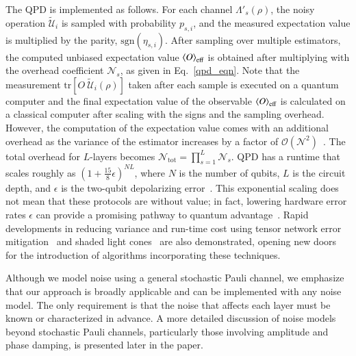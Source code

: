 \documentclass[10pt, superscriptaddress,aps,pra,twocolumn,showpacs,nofootinbib, longbibliography, notitlepage,floatfix]{revtex4-2}
\begin{document}
The QPD is implemented as follows. For each channel $\Lambda'_s(\rho)$, the noisy operation $\mathcal{\tilde{U}}_i$ is sampled with probability $p_{s,i}$, and the measured expectation value is multiplied by the parity, $\text{sgn}(\eta_{s,i})$. After sampling over multiple estimators, the computed unbiased expectation value $\braket{O}_{\text{eff}}$ is obtained after multiplying with the overhead coefficient $\mathcal{N}_s$, as given in Eq.~\eqref{qpd_eqn}. Note that the measurement $\text{tr}[O~\mathcal{\tilde{U}}_i(\rho)]$ taken after each sample is executed on a quantum computer and the final expectation value of the observable $\braket{O}_{\text{eff}}$ is calculated on a classical computer after scaling with the signs and the sampling overhead. However, the computation of the expectation value comes with an additional overhead as the variance of the estimator increases by a factor of $\mathcal{O}(\mathcal{N} ^2)$~\cite{Jinzhao_Sun_PhysRevApplied_2021}. The total overhead for $L$-layers becomes $\mathcal{N}_{\text{tot}} = \prod_{s = 1}^{L}\mathcal{N} _s$. QPD has a runtime that scales roughly as $(1 + \frac{15}{8} \epsilon)^{NL}$, where $N$ is the number of qubits, $L$ is the circuit depth, and $\epsilon$ is the two-qubit depolarizing error~\cite{vandenBerg2023_natphys}. This exponential scaling does not mean that these protocols are without value; in fact, lowering hardware error rates $\epsilon$ can provide a promising pathway to quantum advantage~\cite{aharonov2025importanceerrormitigationquantum, zimborás2025mythsquantumcomputationfault}. Rapid developments in reducing variance and run-time cost using tensor network error mitigation~\cite{fischer2024dynamicalsimulationsmanybodyquantum} and
shaded light cones~\cite{eddins2024lightconeshadingclassicallyaccelerated} are also demonstrated, opening new doors for the introduction of algorithms incorporating these techniques.

Although we model noise using a general stochastic Pauli channel, we emphasize that our approach is broadly applicable and can be implemented with any noise model. The only requirement is that the noise that affects each layer must be known or characterized in advance. A more detailed discussion of noise models beyond stochastic Pauli channels, particularly those involving amplitude and phase damping, is presented later in the paper.
\end{document}
